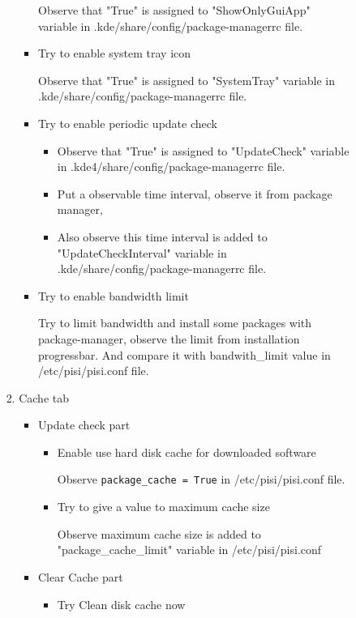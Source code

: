 \documentclass[a4paper,10pt]{article}
\begin{document}
\begin{enumerate}
\begin{enumerate}
\begin{enumerate}
\begin{enumerate}
\begin{itemize}
                    Observe that "True" is assigned to "ShowOnlyGuiApp" variable in .kde/share/config/package-managerrc file.

                    \item Try to enable system tray icon

                    Observe that "True" is assigned to "SystemTray" variable in .kde/share/config/package-managerrc file.

                    \item Try to enable periodic update check
                    \begin{itemize}
                        \item Observe that "True" is assigned to "UpdateCheck" variable in .kde4/share/config/package-managerrc file.
                        \item Put a observable time interval, observe it from package manager,
                        \item Also observe this time interval is added to "UpdateCheckInterval" variable in .kde/share/config/package-managerrc file.
                    \end{itemize}

                    \item Try to enable bandwidth limit

                    Try to limit bandwidth and install some packages with package-manager, observe the limit from installation progressbar. And compare it with bandwith\_limit value in /etc/pisi/pisi.conf file.
                \end{itemize}
                \item Cache tab
                \begin{itemize}
                    \item Update check part
                    \begin{itemize}
                        \item Enable use hard disk cache for downloaded software

                        Observe \texttt{package\_cache = True} in /etc/pisi/pisi.conf file.

                        \item Try to give a value to maximum cache size

                        Observe maximum cache size is added to "package\_cache\_limit" variable in /etc/pisi/pisi.conf
                    \end{itemize}
                    \item Clear Cache part
                    \begin{itemize}
                        \item Try Clean disk cache now


\end{itemize}
\end{itemize}
\end{enumerate}
\end{enumerate}
\end{enumerate}
\end{enumerate}
\end{document}
